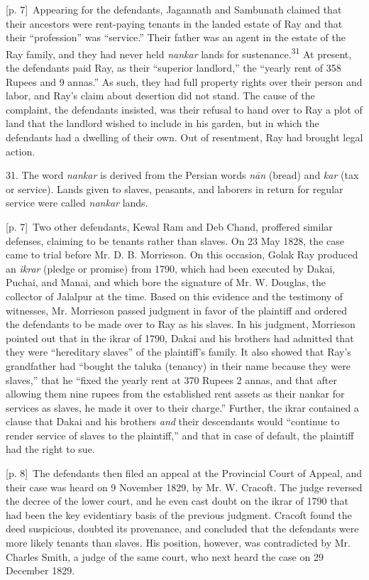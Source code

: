 \documentclass[10pt,a4paper]{article}
\begin{document}
{\scriptsize\color{gray} [p. 7]}\ Appearing for the defendants, Jagannath and Sambunath claimed that their ancestors were rent-paying tenants in the landed estate of Ray and that their “profession” was “service.” Their father was an agent in the estate of the Ray family, and they had never held \textit{nankar} lands for sustenance.\nobreak\textsuperscript{31} At present, the defendants paid Ray, as their “superior landlord,” the “yearly rent of 358 Rupees and 9 annas.” As such, they had full property rights over their person and labor, and Ray’s claim about desertion did not stand. The cause of the complaint, the defendants insisted, was their refusal to hand over to Ray a plot of land that the landlord wished to include in his garden, but in which the defendants had a dwelling of their own. Out of resentment, Ray had brought legal action.\par{\small 31. The word \textit{nankar} is derived from the Persian words \textit{nān} (bread) and \textit{kar} (tax or service). Lands given to slaves, peasants, and laborers in return for regular service were called \textit{nankar} lands.\par}
{\scriptsize\color{gray} [p. 7]}\ Two other defendants, Kewal Ram and Deb Chand, proffered similar defenses, claiming to be tenants rather than slaves. On 23 May 1828, the case came to trial before Mr. D. B. Morrieson. On this occasion, Golak Ray produced an \textit{ikrar} (pledge or promise) from 1790, which had been executed by Dakai, Puchai, and Manai, and which bore the signature of Mr. W. Douglas, the collector of Jalalpur at the time. Based on this evidence and the testimony of witnesses, Mr. Morrieson passed judgment in favor of the plaintiff and ordered the defendants to be made over to Ray as his slaves. In his judgment, Morrieson pointed out that in the ikrar of 1790, Dakai and his brothers had admitted that they were “hereditary slaves” of the plaintiff’s family. It also showed that Ray’s grandfather had “bought the taluka (tenancy) in their name because they were slaves,” that he “fixed the yearly rent at 370 Rupees 2 annas, and that after allowing them nine rupees from the established rent assets as their nankar for services as slaves, he made it over to their charge.” Further, the ikrar contained a clause that Dakai and his brothers \textit{and} their descendants would “continue to render service of slaves to the plaintiff,” and that in case of default, the plaintiff had the right to sue.\par
{\scriptsize\color{gray} [p. 8]}\ The defendants then filed an appeal at the Provincial Court of Appeal, and their case was heard on 9 November 1829, by Mr. W. Cracoft. The judge reversed the decree of the lower court, and he even cast doubt on the ikrar of 1790 that had been the key evidentiary basis of the previous judgment. Cracoft found the deed suspicious, doubted its provenance, and concluded that the defendants were more likely tenants than slaves. His position, however, was contradicted by Mr. Charles Smith, a judge of the same court, who next heard the case on 29 December 1829.\par
\end{document}

